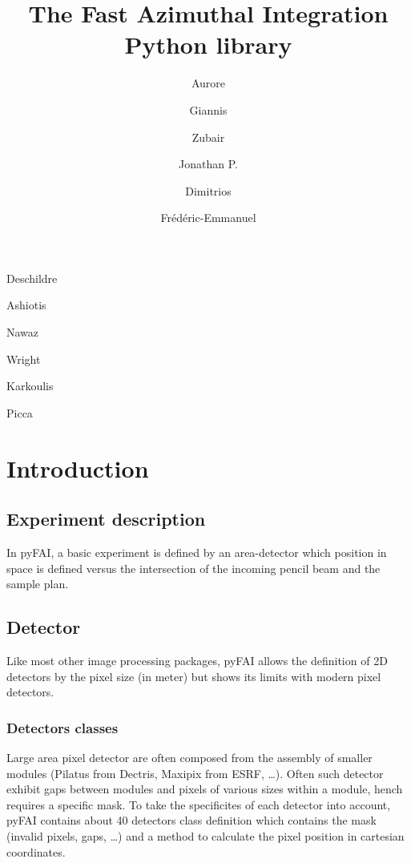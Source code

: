 \documentclass[preprint]{iucr}
\begin{document}
\title{The Fast Azimuthal Integration Python library}

    \author[a]{Aurore}{Deschildre}
    \author[a]{Giannis}{Ashiotis}
    \author[b]{Zubair}{Nawaz}
    \author[a]{Jonathan P.}{Wright}
    \author[a]{Dimitrios}{Karkoulis}
    \author[c]{Fr\'ed\'eric-Emmanuel}{Picca}

\maketitle

\begin{synopsis}

\end{synopsis}

\begin{abstract}
\end{abstract}

\section{Introduction}

\subsection{Experiment description}
In pyFAI, a basic experiment is defined by an area-detector which position in
space is defined versus the intersection of the incoming pencil beam and the
sample plan.

\subsection{Detector}
Like most other image processing packages, pyFAI allows the definition of 2D
detectors by the pixel size (in meter) but shows its limits with modern pixel
detectors.

\subsubsection{Detectors classes}
Large area pixel detector are often composed from the assembly of smaller
modules (Pilatus from Dectris, Maxipix from ESRF, \ldots). 
Often such detector
exhibit gaps between modules and pixels of various sizes within a module, hench
requires a specific mask. 
To take the specificites of each detector into account, pyFAI contains about
40 detectors class definition which contains the mask (invalid pixels, gaps,
\ldots) and a method to calculate the pixel position in cartesian coordinates.
\end{document}
